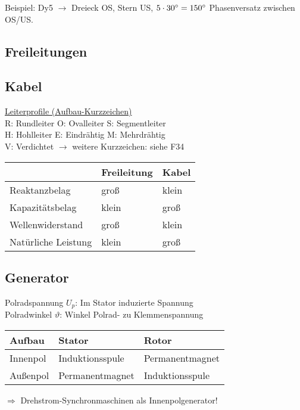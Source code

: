 Beispiel: Dy5 $\rightarrow$ Dreieck OS, Stern US, $5\cdot 30 \degree = 150\degree$ Phasenversatz zwischen OS/US.

\subsection{Freileitungen}
\subsection{Kabel}

\ul{Leiterprofile (Aufbau-Kurzzeichen)}\\
R: Rundleiter \qquad O: Ovalleiter \qquad S: Segmentleiter\\
H: Hohlleiter \qquad E: Eindrähtig \qquad M: Mehrdrähtig \\
V: Verdichtet \quad $\rightarrow$ weitere Kurzzeichen: siehe F34\\


\begin{tabular}[h]{l|l|l|}
    & Freileitung & Kabel\\
    \hline
Reaktanzbelag & groß & klein\\
    \hline
Kapazitätsbelag & klein & groß \\
\hline
Wellenwiderstand & groß & klein \\
\hline
Natürliche Leistung & klein & groß
\end{tabular}

\subsection{Generator}

Polradspannung $U_p$: Im Stator induzierte Spannung\\
Polradwinkel $\vartheta$: Winkel Polrad- zu Klemmenspannung

\begin{tabular}[h]{|l|l|l|}
    \hline
    Aufbau & Stator & Rotor\\
    \hline
    Innenpol & Induktionsspule & Permanentmagnet\\
    \hline
    Außenpol & Permanentmagnet & Induktionsspule\\
    \hline
\end{tabular}

$\Rightarrow$ Drehstrom-Synchronmaschinen als Innenpolgenerator!\\

